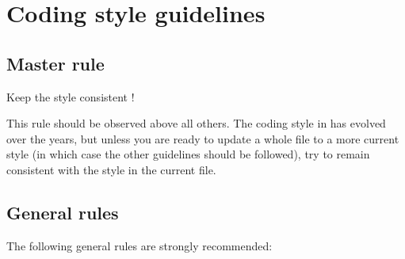 
%
%
%
%


\section{Coding style guidelines}

\subsection{Master rule}

Keep the style consistent !

This rule should be observed above all others. The coding style in \CS
has evolved over the years, but unless you are ready to update a whole
file to a more current style (in which case the other guidelines should be
followed), try to remain consistent with the style in the current file.

\subsection{General rules}

The following general rules are strongly recommended:

